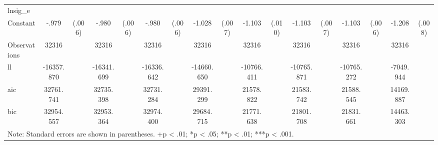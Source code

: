 \begin{table}[htbp]
\begin{tabular}{l*{8}{cc}}
\hline
lnsig\_e         &                  &         &                  &         &                  &         &                  &         &                  &         &                  &         &                  &         &                  &         \\
Constant        &    -.979\sym{***}&   (.006)&    -.980\sym{***}&   (.006)&    -.980\sym{***}&   (.006)&   -1.028\sym{***}&   (.007)&   -1.103\sym{***}&   (.010)&   -1.103\sym{***}&   (.007)&   -1.103\sym{***}&   (.006)&   -1.208\sym{***}&   (.008)\\
\hline
Observations    &    32316         &         &    32316         &         &    32316         &         &    32316         &         &    32316         &         &    32316         &         &    32316         &         &    32316         &         \\
ll              &-16357.870         &         &-16341.699         &         &-16336.642         &         &-14660.650         &         &-10766.411         &         &-10765.871         &         &-10765.272         &         &-7049.944         &         \\
aic             &32761.741         &         &32735.398         &         &32731.284         &         &29391.299         &         &21578.822         &         &21583.742         &         &21588.545         &         &14169.887         &         \\
bic             &32954.557         &         &32953.364         &         &32974.400         &         &29684.715         &         &21771.638         &         &21801.708         &         &21831.661         &         &14463.303         &         \\
\hline\hline
\multicolumn{17}{l}{\footnotesize Note: Standard errors are shown in parentheses. +p < .01; *p < .05; **p < .01; ***p < .001.}\\
\end{tabular}
\end{table}
